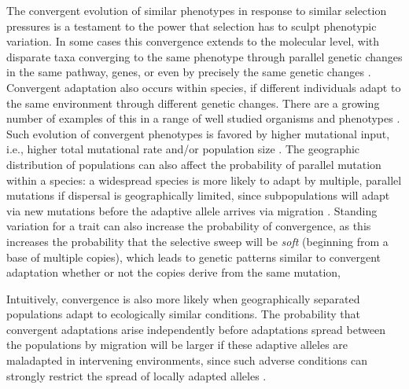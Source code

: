 \documentclass{article}
\newcommand{\citep}[1]{\cite{#1}}
\begin{document}
The convergent evolution of similar phenotypes 
in response to similar selection pressures is a testament to the power that selection 
has to sculpt phenotypic variation. 
In some cases this convergence extends to the molecular level, 
with disparate taxa converging to the same phenotype through parallel 
genetic changes in the same pathway, genes, 
or even by precisely the same genetic changes
\citep{stern2013genetic,zhen2012parallel,martin2013repeated}. 
Convergent adaptation also occurs within species, if different individuals
adapt to the same environment through different genetic changes. 
There are a growing number of examples of this in a range of well studied organisms and phenotypes \citep{Arendt:08}.
Such evolution of convergent phenotypes is favored by higher mutational input, 
i.e., higher total mutational rate and/or population size \citep{softsweepsII}.
The geographic distribution of populations can also affect the probability of parallel mutation within a species:
a widespread species is more likely to adapt by multiple, parallel mutations if dispersal is geographically limited, 
since subpopulations will adapt via new mutations before the adaptive allele arrives via migration \citep{ralph2010parallel}. 
Standing variation for a trait can also increase the probability of convergence, 
as this increases the probability that the selective sweep will be \emph{soft}
(beginning from a base of multiple copies),
which 
leads to genetic patterns similar to convergent adaptation \citep{orr2001sieve,softsweepsI}
whether or not the copies derive from the same mutation,

Intuitively, convergence is also more likely 
when geographically separated populations adapt to ecologically similar conditions. 
The probability that convergent adaptations arise independently
before adaptations spread between the populations by migration
will be larger if these adaptive alleles are maladapted in intervening environments,
since such adverse conditions can strongly restrict the spread of locally adapted alleles \citep{slatkin1973geneflow}.
 
\end{document}
